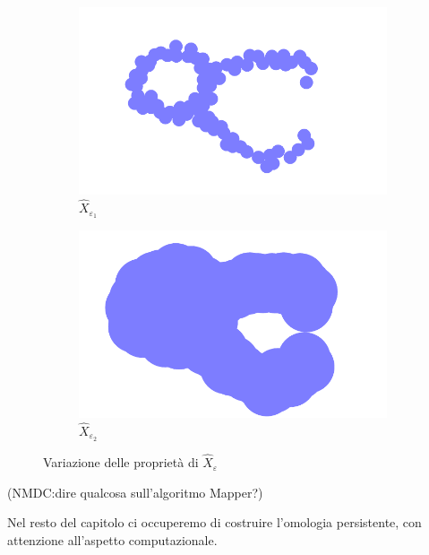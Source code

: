 \begin{figure}[ht]
  \begin{center}
    \begin{subfigure}[b]{.4\textwidth}
      \includegraphics[width=\textwidth]{gfx/double_circle_medium.pdf}
      \caption{$\widehat{X}_{\varepsilon_1}$}
    \end{subfigure}
    \begin{subfigure}[b]{.4\textwidth}
      \includegraphics[width=\textwidth]{gfx/double_circle_fat.pdf}
      \caption{$\widehat{X}_{\varepsilon_2}$}
    \end{subfigure}
    \caption{Variazione delle proprietà di $\widehat{X}_\varepsilon$}
  \end{center}
  \label{fig:doublecirclecomparison}
\end{figure}

(NMDC:dire qualcosa sull'algoritmo Mapper?)

Nel resto del capitolo ci occuperemo di costruire l'omologia persistente, con attenzione all'aspetto computazionale.

